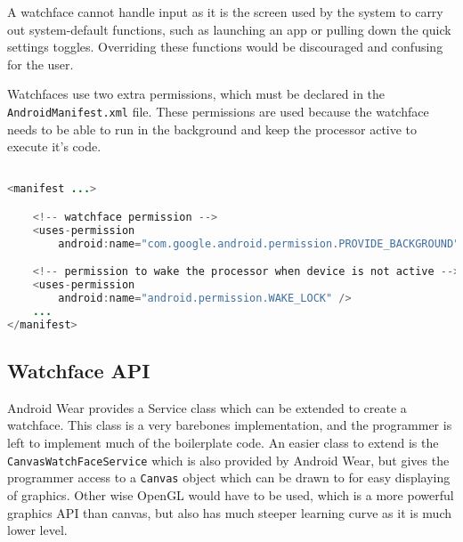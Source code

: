 A watchface cannot handle input as it is the screen used by the system to carry
out system-default functions, such as launching an app or pulling down the
quick settings toggles. Overriding these functions would be discouraged and
confusing for the user.

Watchfaces use two extra permissions, which must be declared in the
\texttt{AndroidManifest.xml} file. These permissions are used because the
watchface needs to be able to run in the background and keep the processor
active to execute it's code.

\begin{lstlisting}[language=Java]

<manifest ...>

    <!-- watchface permission -->
    <uses-permission
        android:name="com.google.android.permission.PROVIDE_BACKGROUND" />

    <!-- permission to wake the processor when device is not active -->
    <uses-permission
        android:name="android.permission.WAKE_LOCK" />
    ...
</manifest>

\end{lstlisting}

\subsection{Watchface API}

Android Wear provides a Service class which can be extended to create a
watchface. This class is a very barebones implementation, and the
programmer is left to implement much of the boilerplate code. An easier class
to extend is the \texttt{CanvasWatchFaceService} which is also provided by
Android Wear, but gives the programmer access to a \texttt{Canvas} object which
can be drawn to for easy displaying of graphics. Other wise OpenGL would have
to be used, which is a more powerful graphics API than canvas, but also has
much steeper learning curve as it is much lower level.

